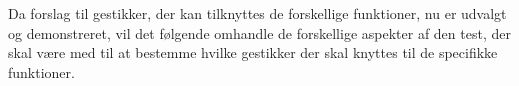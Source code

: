 %
%
%
%
%
%

Da forslag til gestikker, der kan tilknyttes de forskellige funktioner, nu er udvalgt og demonstreret, vil det følgende omhandle de forskellige aspekter af den test, der skal være med til at bestemme hvilke gestikker der skal knyttes til de specifikke funktioner.